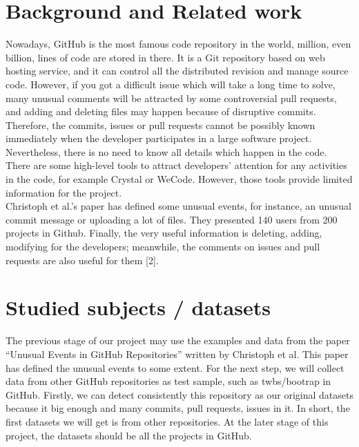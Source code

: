\documentclass[conference]{IEEEtran}
\begin{document}
\section{Background and Related work}

Nowadays, GitHub is the most famous code repository in the world, million, even billion, lines of code are stored in there. It is a Git repository based on web hosting service, and it can control all the distributed revision and manage source code. However, if you got a difficult issue which will take a long time to solve, many unusual comments will be attracted by some controversial pull requests, and adding and deleting files may happen because of disruptive commits.\\

Therefore, the commits, issues or pull requests cannot be possibly known immediately when the developer participates in a large software project. Nevertheless, there is no need to know all details which happen in the code. There are some high-level tools to attract developers’ attention for any activities in the code, for example Crystal or WeCode. However, those tools provide limited information for the project.\\

Christoph et al.’s paper has defined some unusual events, for instance, an unusual commit message or uploading a lot of files. They presented 140 users from 200 projects in Github. Finally, the very useful information is deleting, adding, modifying for the developers; meanwhile, the comments on issues and pull requests are also useful for them [2]. 


\section{Studied subjects / datasets}

The previous stage of our project may use the examples and data from the paper “Unusual Events in GitHub Repositories” written by Christoph et al. This paper has defined the unusual events to some extent. For the next step, we will collect data from other GitHub repositories as test sample, such as twbs/bootrap in GitHub. Firstly, we can detect consistently this repository as our original datasets because it big enough and many commits, pull requests, issues in it. In short, the first datasets we will get is from other repositories. At the later stage of this project, the datasets should be all the projects in GitHub.\\
\end{document}
